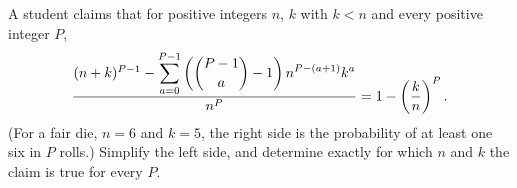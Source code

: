 A student claims that for positive integers $n$, $k$ with $k<n$ and every positive integer $P$,
\[
\dfrac{(n+k)^{P-1}-\displaystyle\sum_{a=0}^{P-1}\left(\dbinom{P-1}{a}-1\right)n^{P-(a+1)}k^{a}}{n^{P}}=1-\left(\dfrac{k}{n}\right)^{P}.
\]
(For a fair die, $n=6$ and $k=5$, the right side is the probability of at least one six in $P$ rolls.) Simplify the left side, and determine exactly for which $n$ and $k$ the claim is true for every $P$.
